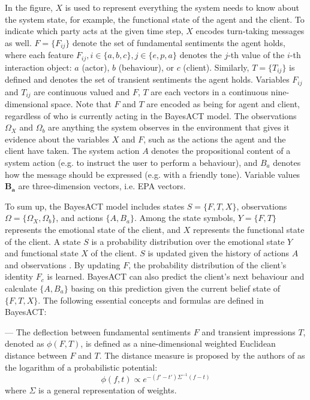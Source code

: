 In the figure, $X$ is used to represent everything the system needs to know about the system state, for example, the functional state of the agent and the client. To indicate which party acts at the given time step, $X$ encodes turn-taking messages as well. $F = \{F_{ij}\}$ denote the set of fundamental sentiments the agent holds, where each feature $F_{ij}, i \in \{a, b, c\}, j \in \{e, p, a\}$ denotes the $j$-th value of the $i$-th interaction object: $a$ (actor), $b$ (behaviour), or $c$ (client). Similarly, $T = \{T_{ij}\}$ is defined and denotes the set of transient sentiments the agent holds. Variables $F_{ij}$ and $T_{ij}$ are continuous valued and $F$, $T$ are each vectors in a continuous nine-dimensional space. Note that $F$ and $T$ are encoded as being for agent and client, regardless of who is currently acting in the BayesACT model. The observations $\Omega_{X}$ and $\Omega_{b}$ are anything the system observes in the environment that gives it evidence about the variables $X$ and $F$, such as the actions the agent and the client have taken. The system action $A$ denotes the propositional content of a system action (e.g. to instruct the user to perform a behaviour), and $B_{a}$ denotes how the message should be expressed (e.g. with a friendly tone). Variable values $\mathbf{B_{a}}$ are three-dimension vectors, i.e. EPA vectors.

To sum up, the BayesACT model includes states $S = \{F, T, X\}$, observations $\Omega = \{\Omega_{X}, \Omega_{b}\}$, and actions $\{A, B_{a}\}$. Among the state symbols, $Y = \{F, T\}$ represents the emotional state of the client, and $X$ represents the functional state of the client. A state $S$ is a probability distribution over the emotional state $Y$ and functional state $X$ of the client. $S$ is updated given the history of actions $A$ and observations . By updating $F$, the probability distribution of the client's identity $F_{c}$ is learned. BayesACT can also predict the client's next behaviour and calculate $\{A, B_{a}\}$ basing on this prediction given the current belief state of $\{F, T, X\}$. The following essential concepts and formulas are defined in BayesACT:

--- The deflection between fundamental sentiments $F$ and transient impressions $T$, denoted as  $\phi(F, T)$, is defined as a nine-dimensional weighted Euclidean distance between $F$ and $T$. The distance measure is proposed by the authors of \cite{hoey2013bayesian} as the logarithm of a probabilistic potential: 
\begin{equation}\label{eq:eq_deflection}
\phi(f,t) \propto e^{-(f'-t')\Sigma^{-1}(f-t)}
\end{equation}
where $\Sigma$ is a general representation of weights. 

